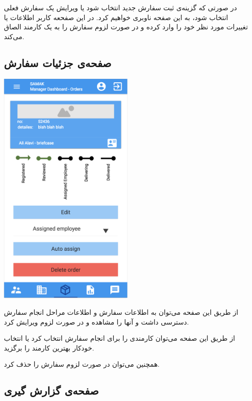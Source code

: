 در صورتی که گزینه‌ی ثبت سفارش جدید انتخاب شود یا ویرایش یک سفارش فعلی انتخاب شود، به این صفحه ناوبری خواهیم کرد. در این صفحعه کاربر اطلاعات یا تغییرات مورد نظر خود را وارد کرده و در صورت لزوم سفارش را به یک کارمند الصاق می‌کند.


\subsection{صفحه‌ی جزئیات سفارش}

\begin{center}
\includegraphics[width = 0.5\textwidth]{images/15-order-details.png}
\end{center}


از طریق این صفحه می‌توان به اطلاعات سفارش و اطلاعات مراحل انجام سفارش  دسترسی داشت و آنها را مشاهده و در صورت لزوم ویرایش کرد.

از طریق این صفحه می‌توان کارمندی را  برای انجام سفارش انتخاب کرد یا انتخاب خودکار بهترین کارمند را برگزید.

همچنین می‌توان در صورت لزوم سفارش را حذف کرد.


\subsection{صفحه‌ی گزارش گیری}

